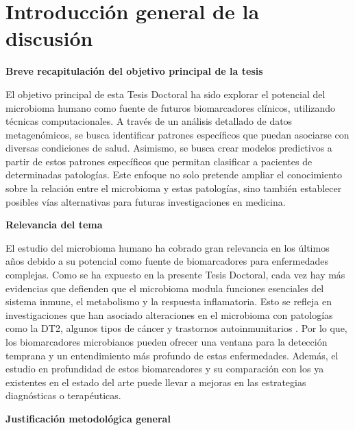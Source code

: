 \section{Introducción general de la discusión}

\textbf{Breve recapitulación del objetivo principal de la tesis}

El objetivo principal de esta Tesis Doctoral ha sido explorar el potencial del microbioma humano como fuente de futuros biomarcadores clínicos, utilizando técnicas computacionales. A través de un análisis detallado de datos metagenómicos, se busca identificar patrones específicos que puedan asociarse con diversas condiciones de salud. Asimismo, se busca crear modelos predictivos a partir de estos patrones específicos que permitan clasificar a pacientes de determinadas patologías. Este enfoque no solo pretende ampliar el conocimiento sobre la relación entre el microbioma y estas patologías, sino también establecer posibles vías alternativas para futuras investigaciones en medicina.


\textbf{Relevancia del tema}

El estudio del microbioma humano ha cobrado gran relevancia en los últimos años debido a su potencial como fuente de biomarcadores para enfermedades complejas. Como se ha expuesto en la presente Tesis Doctoral, cada vez hay más evidencias que defienden que el microbioma modula funciones esenciales del sistema inmune, el metabolismo y la respuesta inflamatoria. Esto se refleja en investigaciones que han asociado alteraciones en el microbioma con patologías como la DT2, algunos tipos de cáncer y trastornos autoinmunitarios \cite{schirmer2016linking, fan2021gut, bakir2022inflammatory}. Por lo que, los biomarcadores microbianos pueden ofrecer una ventana para la detección temprana y un entendimiento más profundo de estas enfermedades. Además, el estudio en profundidad de estos biomarcadores y su comparación con los ya existentes en el estado del arte puede llevar a mejoras en las estrategias diagnósticas o terapéuticas. 

\textbf{Justificación metodológica general}

